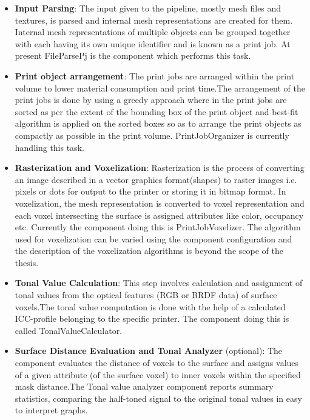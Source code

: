 \begin{itemize}
\item \textbf{Input Parsing}: The input given to the pipeline, mostly mesh files and textures, is parsed and internal mesh representations are created for them. Internal mesh representations of multiple objects can be grouped together with each having it\textquotesingle s own unique identifier and is known as a print job. At present FileParsePj is the component which performs this task. \newline 

\item \textbf{Print object arrangement}: The print jobs are arranged within the print volume to lower material consumption and print time.The arrangement of the print jobs is done by using a greedy approach where in the print jobs are sorted as per the extent of the bounding box of the print object and best-fit algorithm is applied on the sorted boxes so as to arrange the print objects as compactly as possible in the print volume. PrintJobOrganizer is currently handling this task. \newline 

\item \textbf{Rasterization and Voxelization}: Rasterization is the process of converting an image described in a vector graphics format(shapes) to raster images i.e. pixels or dots for output to the printer or storing it in bitmap format. In voxelization, the mesh representation is converted to voxel representation and each voxel intersecting the surface is assigned attributes like color, occupancy etc. Currently the component doing this is PrintJobVoxelizer. The algorithm used for voxelization can be varied using the component configuration and the description of the voxelization algorithms is beyond the scope of the thesis. \newline 
 
\item \textbf{Tonal Value Calculation}: This step involves calculation and assignment of tonal values from the optical features (RGB or BRDF data) of surface voxels.The tonal value computation is done with the help of a calculated ICC-profile  belonging to the specific printer. The component doing this is called TonalValueCalculator.

\item \textbf{Surface Distance Evaluation and Tonal Analyzer} (optional): The component evaluates the distance of voxels to the surface and assigns values of a given attribute (of the surface voxel)  to inner voxels within the specified mask distance.The Tonal value analyzer component reports summary statistics, comparing the half-toned signal to the original tonal values in easy to interpret graphs.\newline


\end{itemize}
